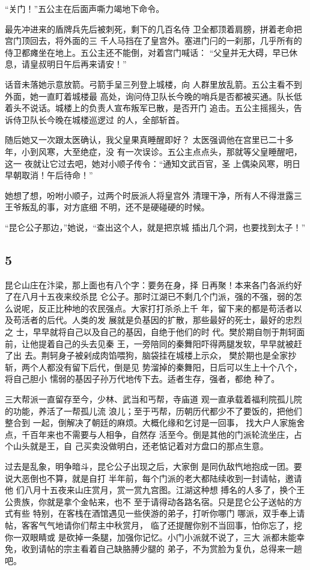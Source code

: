 “关门！”五公主在后面声嘶力竭地下命令。

最先冲进来的盾牌兵先后被刺死，剩下的几百名侍
卫全都顶着肩膀，拼着老命把宫门顶回去，将外面的三
千人马挡在了皇宫外。塞进门闩的一刹那，几乎所有的
侍卫都瘫坐在地上。五公主还不能倒，对着宫门喊话：
“父皇并无大碍，早已休息，请皇叔明日午后再来请安！”

话音未落她示意放箭。弓箭手呈三列登上城楼，向
人群里放乱箭。五公主看不到外面，她一直盯着城楼最
高处，询问侍卫队长今晚的哨兵是否都被买通。队长低
着头不说话。城楼上的负责人宣布叛军已散，是否开门
追击。五公主摇摇头，告诉侍卫队长今晚在城楼巡逻过
的人，全部斩首。

随后她又一次跟太医确认，我父皇果真睡醒即好？
太医强调他在宫里已二十多年，小到风寒，大至绝症，没
有一次误诊。五公主点点头，那就等父皇睡醒吧，这一
夜就让它过去吧，她对小顺子传令：“通知文武百官，圣
上偶染风寒，明日早朝取消！午后待命！”

她想了想，吩咐小顺子，过两个时辰派人将皇宫外
清理干净，所有人不得泄露三王爷叛乱的事，对方底细
不明，还不是硬碰硬的时候。

“昆仑公子那边，”她说，“查出这个人，就是把京城
插出几个洞，也要找到太子！”
\newline

{\centering\subsection{5}}

昆仑山庄在汴梁，那上面也有八个字：要务在身，择
日再聚！本来各门各派约好了在八月十五夜来绞杀昆
仑公子。那时江湖已不剩几个门派，强的不强，弱的怎
么说呢，反正比种地的农民强点。大家打打杀杀上千
年，留下来的都是苟活者以及苟活者的后代。人类的发
展就是负基因的扩散，那些最好的死士，最好的忠烈之
士，早早就将自己以及自己的基因，自绝于他们的时
代。樊於期自刎于荆轲面前，让他提着自己的头去见秦
王，一旁陪同的秦舞阳吓得两腿发软，早早就被赶了出
去。荆轲身子被剁成肉馅喂狗，脑袋挂在城楼上示众，
樊於期也是全家抄斩，两个人都没有留下后代，倒是见
势溜掉的秦舞阳，日后可以生上十个八个，将自己胆小
懦弱的基因子孙万代地传下去。适者生存，强者，都绝
种了。

三大帮派一直留存至今，少林、武当和丐帮，寺庙道
观一直承载着福利院孤儿院的功能，养活了一帮孤儿流
浪儿；至于丐帮，历朝历代都少不了要饭的，把他们整合到
一起，倒解决了朝廷的麻烦。大概化缘和乞讨是一回事，
找大户人家施舍点，千百年来也不需要与人相争，自然存
活至今。倒是其他的门派轮流坐庄，占个山头就是王，自
己买卖没做明白，还老惦记着对方盘口的那点生意。

过去是乱象，明争暗斗，昆仑公子出现之后，大家倒
是同仇敌忾地抱成一团。要说大恶倒也不算，就是自打
半年前，每个门派的老大都陆续收到一封请帖，邀请他
们八月十五夜来山庄赏月，赏一赏九宫图。江湖这种想
搏名的人多了，换个王公贵族，你就是拿个金帖来，也不
至于请得动各路名宿。只是昆仑公子送帖的方式有些
特别，在客栈在酒馆遇见一些侠游的弟子，打听你哪门
哪派，双手奉上请帖，客客气气地请你们帮主中秋赏月，
临了还提醒你别不当回事，怕你忘了，挖你一双眼睛或
是砍掉一条腿，加强你记忆。小门小派就不说了，三大
派都未能幸免，收到请帖的宗主看着自己缺胳膊少腿的
弟子，不为赏脸为复仇，总得来一趟吧。

